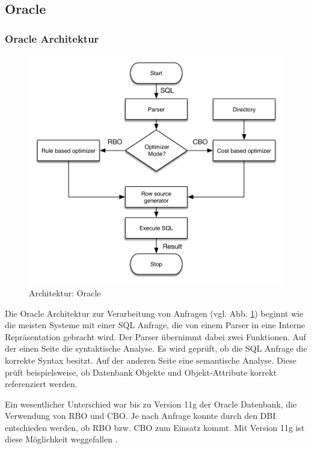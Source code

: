 \subsection{Oracle}
\subsubsection{Oracle Architektur}


\begin{figure}[ht]
  \centering
  \includegraphics[scale=0.75]{02_Related_Work/Oracle.pdf}
  \caption{Architektur: Oracle \cite{Oracle2004Basics}}
  \label{OracleArchitecture}
\end{figure}


Die Oracle Architektur zur Verarbeitung von Anfragen \cite{Oracle2004Basics}  (vgl. Abb. \ref{OracleArchitecture})  beginnt wie die meisten Systeme mit einer SQL Anfrage, die von einem Parser in eine Interne Repräsentation gebracht wird. Der Parser übernimmt dabei zwei Funktionen. Auf der einen Seite die syntaktische Analyse. Es wird geprüft, ob die SQL Anfrage die korrekte Syntax besitzt. Auf der anderen Seite eine semantische Analyse. Diese prüft beispielsweise, ob Datenbank Objekte und Objekt-Attribute  korrekt referenziert werden. 

Ein wesentlicher Unterschied war bis zu Version 11g der Oracle Datenbank,  die Verwendung von \ac{RBO} und \ac{CBO}. Je nach Anfrage konnte durch den \ac{DBI} entschieden werden, ob \ac{RBO} bzw. \ac{CBO} zum Einsatz kommt. Mit Version 11g ist diese Möglichkeit weggefallen \cite{dba_oracle2015}. 

